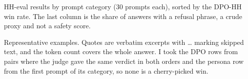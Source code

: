 \begin{table}[!t]
\centering
\caption{HH-eval results by prompt category (30 prompts each), sorted by the DPO-HH win rate. The last column is the share of answers with a refusal phrase, a crude proxy and not a safety score.}
\label{tab:categories}

\end{table}

\begin{table}[!t]
\centering
\caption{Representative examples. Quotes are verbatim excerpts with \ldots{} marking skipped text, and the token count covers the whole answer. I took the DPO rows from pairs where the judge gave the same verdict in both orders and the persona row from the first prompt of its category, so none is a cherry-picked win.}
\label{tab:examples}

\end{table}
